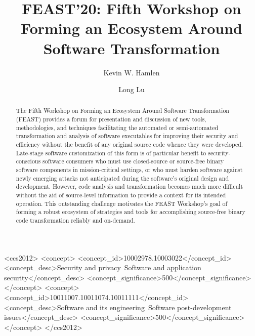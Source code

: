 \documentclass[sigconf]{acmart}
\begin{document}
\fancyhead{}

\title{FEAST'20: Fifth Workshop on Forming an Ecosystem Around Software Transformation}

\author{Kevin W. Hamlen}

\author{Long Lu}

\begin{abstract}
The Fifth Workshop on Forming an Ecosystem Around Software Transformation (FEAST)
provides a forum for presentation and discussion of new tools, methodologies, and techniques facilitating
the automated or semi-automated transformation and analysis of software executables
for improving their security and efficiency without the benefit of any
original source code whence they were developed.
Late-stage software customization of this form is of particular benefit to security-conscious software consumers who must use closed-source or source-free binary software components in mission-critical settings,
or who must harden software against newly emerging attacks not anticipated during the software's original design and development.
However, code analysis and transformation becomes much more difficult without the aid of source-level information to provide a context for its intended operation.
This outstanding challenge motivates the FEAST Workshop's goal of forming a robust ecosystem of strategies and tools for accomplishing source-free binary code transformation reliably and on-demand.
\end{abstract}

\begin{CCSXML}
<ccs2012>
  <concept>
    <concept_id>10002978.10003022</concept_id>
    <concept_desc>Security and privacy~Software and application security</concept_desc>
    <concept_significance>500</concept_significance>
  </concept>
  <concept>
    <concept_id>10011007.10011074.10011111</concept_id>
    <concept_desc>Software and its engineering~Software post-development issues</concept_desc>
    <concept_significance>500</concept_significance>
  </concept>
</ccs2012>
\end{CCSXML}

\end{document}
